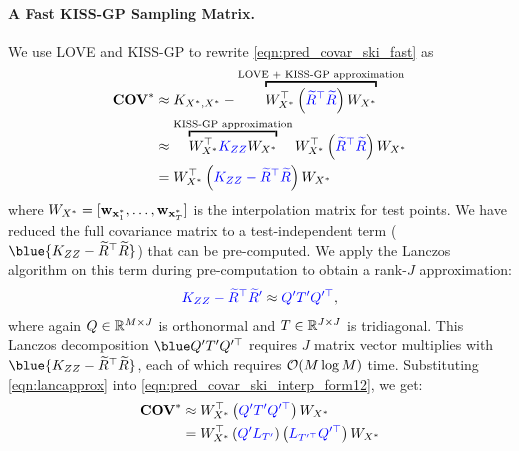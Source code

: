 \paragraph{A Fast KISS-GP Sampling Matrix.}
We use LOVE{} and KISS-GP to rewrite \cref{eqn:pred_covar_ski_fast} as
%
\begin{align}
  \Covtest
  &\approx
  \bK_{\bXtest, \bXtest} - \overbracket{
    \bW^\top_{\bXtest} \left( {\color{blue} \widetilde \bR^\top \widetilde \bR} \right) \bW_{\bXtest}
  }^\text{LOVE + KISS-GP approximation}
  \nonumber
  \\
  &\approx \overbracket{
    \bW^\top_{\bXtest} {\color{blue} \bK_{\bZ\bZ} } \bW_{\bXtest}
  }^\text{KISS-GP approximation}
    \bW^\top_{\bXtest} \left( {\color{blue} \widetilde \bR^\top \widetilde \bR} \right) \bW_{\bXtest}
  \nonumber
  \\
  &= \bW^\top_{\bXtest} \left( {\color{blue} \bK_{\bZ\bZ} - \widetilde \bR^\top \widetilde \bR } \right) \bW_{\bXtest}
  \label{eqn:pred_covar_ski_interp_form12}
\end{align}
%
where $W_{X^*} = [\mathbf{w}_{\mathbf{x}^*_1}, \ldots, \mathbf{w}_{\mathbf{x}^*_T}]$ is the interpolation matrix for test points.
We have reduced the full covariance matrix to a test-independent term ($\blue{ \bK_{\bZ\bZ} - \widetilde \bR^\top \widetilde \bR }$) that can be pre-computed.
We apply the Lanczos algorithm on this term during pre-computation to obtain a rank-$J$ approximation:
%
\begin{align}
  { \color{blue} \ensuremath{K}_{\ensuremath{Z}\ensuremath{Z}} -  \widetilde {\ensuremath{R}}^\top \widetilde {\ensuremath{R}}' }
  \approx
  { \color{blue} \ensuremath{Q}' \ensuremath{T}' \ensuremath{Q}^{\prime\top} },
  \label{eqn:lancapprox}
\end{align}
%
where again $Q \in \mathbb{R}^{M \times J}$ is orthonormal and $T \in \mathbb{R}^{J \times J}$ is tridiagonal.
This Lanczos decomposition $\blue \bQ' \bT' \bQ^{\prime\top}$ requires $J$ matrix vector multiplies with $\blue{ \bK_{\bZ\bZ} - \widetilde \bR^{\top} \widetilde \bR }$, each of which requires $\bigo{M \log M}$ time.
Substituting \cref{eqn:lancapprox} into \cref{eqn:pred_covar_ski_interp_form12}, we get:
%
\begin{align}
  \textbf{COV}^*
  &\approx W^\top_{X^*} \left( {\color{blue} Q' T' Q^{\prime\top} } \right) W_{X^*}
  \nonumber
  \\
  &= W^\top_{X^*} \left( {\color{blue} Q' L_{T'} } \right)
  \left( {\color{blue} L_{T^{\prime\top}} Q^{\prime\top} } \right) W_{X^*}
  \label{eqn:sampling_pre_cholesky}
\end{align}
